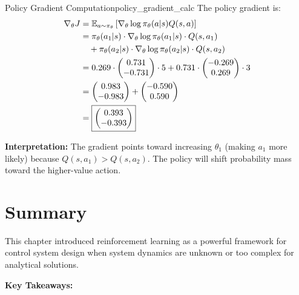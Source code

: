 \begin{example}{Policy Gradient Computation}{policy_gradient_calc}
The policy gradient is:
\begin{align}
\nabla_\theta J &= \mathbb{E}_{a \sim \pi_\theta} \left[ \nabla_\theta \log \pi_\theta(a|s) Q(s,a) \right] \\
&= \pi_\theta(a_1|s) \cdot \nabla_\theta \log \pi_\theta(a_1|s) \cdot Q(s,a_1) \\
&\quad + \pi_\theta(a_2|s) \cdot \nabla_\theta \log \pi_\theta(a_2|s) \cdot Q(s,a_2) \\
&= 0.269 \cdot \begin{pmatrix} 0.731 \\ -0.731 \end{pmatrix} \cdot 5 + 0.731 \cdot \begin{pmatrix} -0.269 \\ 0.269 \end{pmatrix} \cdot 3 \\
&= \begin{pmatrix} 0.983 \\ -0.983 \end{pmatrix} + \begin{pmatrix} -0.590 \\ 0.590 \end{pmatrix} \\
&= \boxed{\begin{pmatrix} 0.393 \\ -0.393 \end{pmatrix}}
\end{align}

\textbf{Interpretation:} The gradient points toward increasing $\theta_1$ (making $a_1$ more likely) because $Q(s, a_1) > Q(s, a_2)$. The policy will shift probability mass toward the higher-value action.
\end{example}

\section{Summary}
\label{sec:summary}

This chapter introduced reinforcement learning as a powerful framework for control system design when system dynamics are unknown or too complex for analytical solutions.

\textbf{Key Takeaways:}

